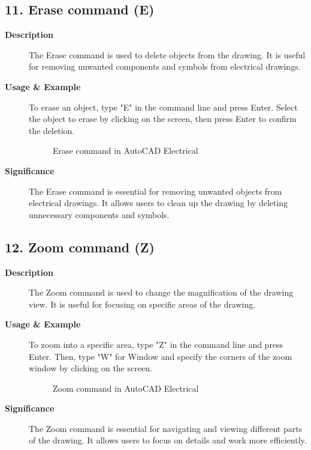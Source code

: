 \documentclass[12pt]{article}
\begin{document}
\subsection*{11. Erase command (E)}
\begin{description}
    \item [\textbf{Description}] The Erase command is used to delete objects from the drawing. It is useful for removing unwanted components and symbols from electrical drawings.
    \item [\textbf{Usage \& Example}]To erase an object, type "E" in the command line and press Enter. Select the object to erase by clicking on the screen, then press Enter to confirm the deletion.
          \begin{figure}[H]
              \centering
              \caption{Erase command in AutoCAD Electrical}
          \end{figure}
    \item [\textbf{Significance}] The Erase command is essential for removing unwanted objects from electrical drawings. It allows users to clean up the drawing by deleting unnecessary components and symbols.
\end{description}

\subsection*{12. Zoom command (Z)}
\begin{description}
    \item [\textbf{Description}] The Zoom command is used to change the magnification of the drawing view. It is useful for focusing on specific areas of the drawing.
    \item [\textbf{Usage \& Example}]To zoom into a specific area, type "Z" in the command line and press Enter. Then, type "W" for Window and specify the corners of the zoom window by clicking on the screen.
          \begin{figure}[H]
              \centering
              \caption{Zoom command in AutoCAD Electrical}
          \end{figure}
    \item [\textbf{Significance}] The Zoom command is essential for navigating and viewing different parts of the drawing. It allows users to focus on details and work more efficiently.
\end{description}
\end{document}
